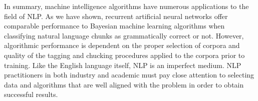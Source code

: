\documentclass{article}
\begin{document}
In summary, machine intelligence algorithms have numerous applications to the field of NLP. As we have shown, recurrent artificial neural networks offer comparable performance to Bayesian machine learning algorithms when classifying natural language chunks as grammatically correct or not. However, algorithmic performance is dependent on the proper selection of corpora and quality of the tagging and chucking procedures applied to the corpora prior to training. Like the English language itself, NLP is an imperfect medium. NLP practitioners in both industry and academic must pay close attention to selecting data and algorithms that are well aligned with the problem in order to obtain successful results.






\end{document}
